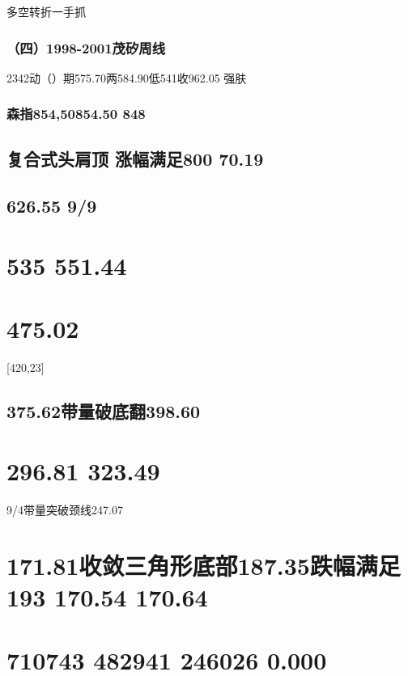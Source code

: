 \documentclass{article}
\begin{document}
多空转折一手抓

\subsubsection{（四）1998-2001茂矽周线}

2342动（）期575.70两584.90低541收962.05 强肤

\subsubsection{森指854,50854.50 848}

\subsection{复合式头肩顶 涨幅满足800 70.19}

\subsection{626.55 9/9}

\section{535 551.44}

\section{475.02}

[420,23]

\subsection{375.62带量破底翻398.60}

\section{296.81 323.49}

9/4带量突破颈线247.07

\section{171.81收敛三角形底部187.35跌幅满足193 170.54 170.64}

\section{710743 482941 246026 0.000}
\end{document}
